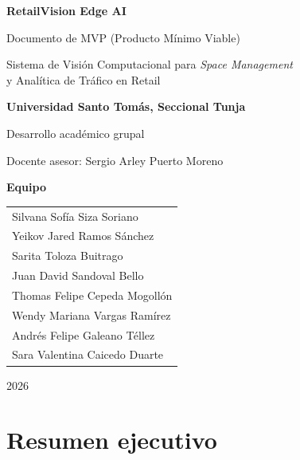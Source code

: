 \documentclass[11pt,a4paper]{report}
\begin{document}
\begin{titlepage}
\centering
\vspace*{1.5cm}
{\Huge\bfseries\color{rvAccent} RetailVision Edge AI\par}
\vspace{0.4cm}
{\Large\color{rvInk} Documento de MVP (Producto Mínimo Viable)\par}
\vspace{0.3cm}
{\large\color{rvMuted} Sistema de Visión Computacional para \textit{Space Management}\\
y Analítica de Tráfico en Retail\par}
\vspace{2.2cm}

{\large\color{rvInk}\textbf{Universidad Santo Tomás, Seccional Tunja}\par}
\vspace{0.2cm}
{\normalsize\color{rvMuted} Desarrollo académico grupal\par}
\vspace{0.15cm}
{\normalsize\color{rvMuted} Docente asesor: Sergio Arley Puerto Moreno\par}

\vspace{2.2cm}
{\normalsize\color{rvInk}\textbf{Equipo}\par}
\vspace{0.3cm}
\begin{tabular}{l}
Silvana Sofía Siza Soriano \\
Yeikov Jared Ramos Sánchez \\
Sarita Toloza Buitrago \\
Juan David Sandoval Bello \\
Thomas Felipe Cepeda Mogollón \\
Wendy Mariana Vargas Ramírez \\
Andrés Felipe Galeano Téllez \\
Sara Valentina Caicedo Duarte \\
\end{tabular}

\vfill
{\large\color{rvMuted} 2026\par}
\end{titlepage}

\tableofcontents
\clearpage

\chapter{Resumen ejecutivo}
\end{document}
